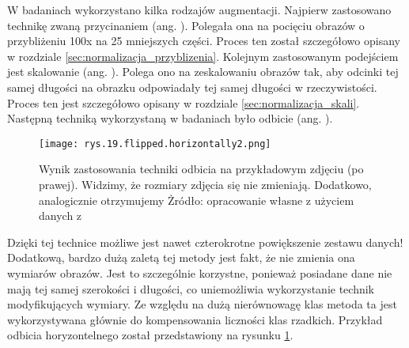 W badaniach wykorzystano kilka rodzajów augmentacji. Najpierw zastosowano technikę zwaną przycinaniem (ang. ). Polegała ona na pocięciu obrazów o przybliżeniu 100x na 25 mniejszych części. Proces ten został szczegółowo opisany w rozdziale \ref{sec:normalizacja_przyblizenia}. Kolejnym zastosowanym podejściem jest skalowanie (ang. ).  Polega ono na zeskalowaniu obrazów tak, aby odcinki tej samej długości na obrazku odpowiadały tej samej długości w rzeczywistości. Proces ten jest szczegółowo opisany w rozdziale \ref{sec:normalizacja_skali}. Następną techniką wykorzystaną w badaniach było odbicie (ang. ).
\begin{figure}[h]
    \centering
    \texttt{[image: rys.19.flipped.horizontally2.png]}
    \caption{Wynik zastosowania techniki odbicia na przykładowym zdjęciu (po prawej). Widzimy, że rozmiary zdjęcia się nie zmieniają. Dodatkowo, analogicznie otrzymujemy Żródło: opracowanie własne z użyciem danych z \cite{Pirowski17}}
    \label{fig:mesh19}
\end{figure}
Dzięki tej technice możliwe jest nawet czterokrotne powiększenie zestawu danych! Dodatkową, bardzo dużą zaletą tej metody jest fakt, że nie zmienia ona wymiarów obrazów. Jest to szczególnie korzystne, ponieważ posiadane  dane nie mają tej samej szerokości i długości, co uniemożliwia wykorzystanie technik modyfikujących wymiary. Ze względu na dużą nierównowagę klas metoda ta jest wykorzystywana głównie do kompensowania liczności klas rzadkich. Przykład odbicia horyzontelnego został przedstawiony na rysunku \ref{fig:mesh19}.















